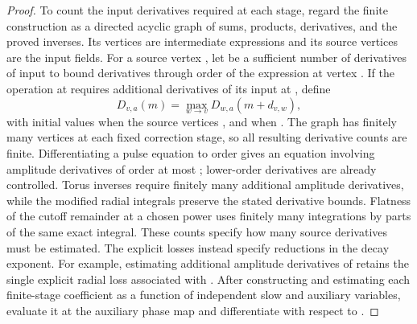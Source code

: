 \begin{proof}
To count the input derivatives required at each stage, regard the finite construction as a directed
acyclic graph of sums, products, derivatives, and the proved inverses. Its vertices are intermediate
expressions and its source vertices are the input fields. For a source vertex
, let  be a sufficient number of
derivatives of input  to bound derivatives through order
 of the expression at vertex . If the operation at
 requires  additional derivatives of its
input at , define
\[
D_{v,a}(m)=\max_{w\to v}D_{w,a}(m+d_{v,w}),
\]
with initial values  when the source vertices
, and  when
. The graph has finitely many vertices at each fixed correction stage,
so all resulting derivative counts are finite. Differentiating a pulse equation to order
 gives an equation involving amplitude derivatives of order at most
; lower-order derivatives are already controlled. Torus inverses require
finitely many additional amplitude derivatives, while the modified radial integrals preserve the
stated derivative bounds. Flatness of the cutoff remainder at a chosen power uses finitely many
integrations by parts of the same exact integral. These counts specify how many source derivatives
must be estimated. The explicit  losses instead specify reductions
in the decay exponent. For example, estimating additional amplitude derivatives of
 retains the single explicit radial loss associated with
. After constructing and estimating each finite-stage coefficient as a
function of independent slow and auxiliary variables, evaluate it at the auxiliary phase map
 and differentiate with respect to
.
\end{proof}

